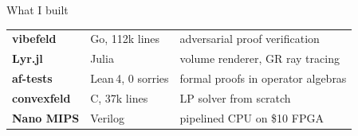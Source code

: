 \documentclass[aspectratio=169, 14pt]{beamer}
\begin{document}




\begin{frame}{What I built}
  \vfill
  \centering
  \renewcommand{\arraystretch}{1.4}
  {\fontsize{13}{18}\selectfont
  \begin{tabular}{l@{\hspace{0.8em}}l@{\hspace{0.8em}}l}
    \textbf{\color{tjo@darkteal}vibefeld}
      & Go, 112k lines
      & adversarial proof verification \\
    \textbf{\color{tjo@darkteal}Lyr.jl}
      & Julia
      & volume renderer, GR ray tracing \\
    \textbf{\color{tjo@darkteal}af-tests}
      & Lean\,4, 0 sorries
      & formal proofs in operator algebras \\
    \textbf{\color{tjo@darkteal}convexfeld}
      & C, 37k lines
      & LP solver from scratch \\
    \textbf{\color{tjo@darkteal}Nano MIPS}
      & Verilog
      & pipelined CPU on \$10 FPGA \\
  \end{tabular}
  }
  \vfill
\end{frame}
\end{document}
